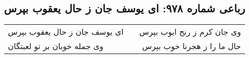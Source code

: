 \begin{center}
\section*{رباعی شماره ۹۷۸: ای یوسف جان ز حال یعقوب بپرس}
\label{sec:0978}
\begin{longtable}{l p{0.5cm} r}
ای یوسف جان ز حال یعقوب بپرس
&&
وی جان کرم ز رنج ایوب بپرس
\\
وی جمله خوبان بر تو لعبتگان
&&
حال ما را ز هجرنا خوب بپرس
\\
\end{longtable}
\end{center}
